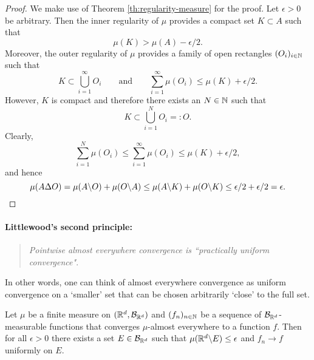 \begin{proof}
	We make use of Theorem \ref{th:regularity-measure} for the proof.
Let $\epsilon > 0$ be arbitrary. Then the inner regularity of $\mu$ provides a compact set $K \subset A$ such that
\[
\mu(K) > \mu(A) - \epsilon/2.
\]	
Moreover, the outer regularity of $\mu$ provides a family of open rectangles $(O_i)_{i\in\mathbb N}$ such that
\[
	K \subset \bigcup_{i=1}^\infty O_i\qquad\text{and}\qquad \sum_{i=1}^\infty \mu(O_i) \leq \mu(K) + \epsilon / 2.
\]
However, $K$ is compact and therefore there exists an $N \in \mathbb N$ such that
\[
K \subset \bigcup_{i=1}^N O_i =: O.
\]
Clearly,
\[
\sum_{i=1}^N \mu(O_i) \leq \sum_{i=1}^\infty \mu(O_i) \leq \mu(K) + \epsilon / 2,
\]
and hence
\[
\mu(A \Delta O) 
= \mu(A \backslash O) + \mu(O \backslash A)
\leq \mu(A \backslash K) + \mu(O \backslash K)
 \leq  \epsilon /2 + \epsilon /2=\epsilon.\qedhere
\]
\end{proof}


\paragraph{Littlewood's second principle:} 
\begin{quotation}
	\emph{Pointwise almost everywhere convergence is ``practically uniform convergence"}.
\end{quotation}

In other words, one can think of almost everywhere convergence as uniform convergence on a `smaller' set that can be chosen arbitrarily `close' to the full set. 

\begin{theorem}
	Let $\mu$ be a finite measure on $(\mathbb R^d,\mathcal B_{\mathbb R^d})$ and $(f_n)_{n\in\mathbb N}$ be a sequence of $\mathcal B_{\mathbb R^d}$-measurable functions that converges $\mu$-almost everywhere to a function $f$. 
	Then for all $\epsilon > 0$ there exists a set $E\in \mathcal B_{\mathbb R^d}$ such that
	$\mu(\mathbb R^d\backslash E) \le\epsilon$ and $f_n \to f$ uniformly on $E$.
\end{theorem}

